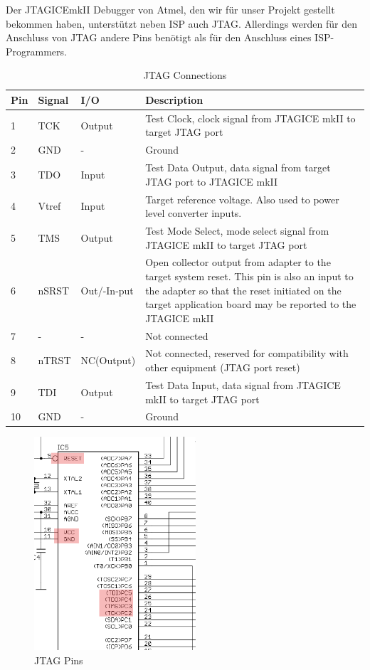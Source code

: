 Der JTAGICEmkII Debugger von Atmel, den wir für unser Projekt gestellt bekommen
haben, unterstützt neben ISP auch JTAG. Allerdings werden für den Anschluss von
JTAG andere Pins benötigt als für den Anschluss eines ISP-Programmers.

\begin{table}
\begin{longtable}{|l|l|l|p{8.8cm}|}\hline 
Pin & Signal & I/O & Description \\ \hline 
1 & TCK & Output & Test Clock, clock signal from JTAGICE mkII to target JTAG port \\ \hline 
2 & GND & - & Ground \\ \hline 
3 & TDO & Input & Test Data Output, data signal from target JTAG port to JTAGICE mkII \\ \hline 
4 & Vtref & Input & Target reference voltage. Also used to power level converter inputs. \\ \hline 
5 & TMS & Output & Test Mode Select, mode select signal from JTAGICE mkII to target JTAG port \\ \hline 
6 & nSRST & Out/-In-put & Open collector output from adapter to the target system reset. This pin is also an input to the adapter so that the reset initiated on the target application board may be reported to the JTAGICE mkII \\ \hline 
7 & - & - & Not connected \\ \hline 
8 & nTRST & NC(Output) & Not connected, reserved for compatibility with other equipment (JTAG port reset) \\ \hline 
9 & TDI & Output & Test Data Input, data signal from JTAGICE mkII to target JTAG port \\ \hline 
10 & GND & - & Ground \\ \hline 
\end{longtable}
\caption{JTAG Connections \cite{JTAGICEmkII.Quick}}
\label{jtag.Connections}
\end{table}

\begin{figure}[htp]
\begin{center}
  \includegraphics[width=6cm]{content/pictures/jatgPins.png}
  \caption{JTAG Pins}
  \label{jtag.pins}
\end{center}
\end{figure}

